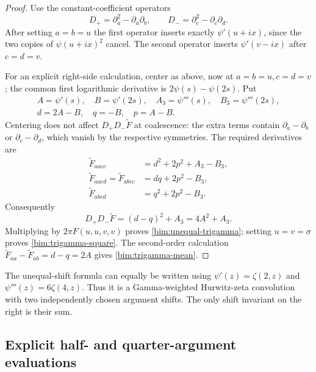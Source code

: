 \documentclass[11pt,a4paper]{article}
\numberwithin{equation}{section}
\theoremstyle{definition}
\theoremstyle{remark}
\begin{document}
\begin{proof}
Use the constant-coefficient operators
\[
 D_+=\partial_a^2-\partial_a\partial_b,
 \qquad D_-=\partial_c^2-\partial_c\partial_d.
\]
After setting $a=b=u$ the first operator inserts exactly
$\psi'(u+ix)$, since the two copies of $\psi(u+ix)^2$ cancel.  The
second operator inserts $\psi'(v-ix)$ after $c=d=v$.

For an explicit right-side calculation, center as above, now at
$a=b=u,c=d=v$; the common first logarithmic derivative is
$2\psi(s)-\psi(2s)$.  Put
\[
 \begin{gathered}
 A=\psi'(s),\quad B=\psi'(2s),\quad
 A_3=\psi'''(s),\quad B_3=\psi'''(2s),\\
 d=2A-B,\quad q=-B,\quad p=A-B.
 \end{gathered}
\]
Centering does not affect $D_+D_-\widetilde F$ at coalescence: the extra
terms contain $\partial_a-\partial_b$ or
$\partial_c-\partial_d$, which vanish by the respective symmetries.
The required derivatives are
\begin{align*}
 \widetilde F_{aacc}&=d^2+2p^2+A_3-B_3,\\
 \widetilde F_{aacd}=\widetilde F_{abcc}&=dq+2p^2-B_3,\\
 \widetilde F_{abcd}&=q^2+2p^2-B_3.
\end{align*}
Consequently
\[
 D_+D_-\widetilde F=(d-q)^2+A_3=4A^2+A_3.
\]
Multiplying by $2\pi F(u,u,v,v)$ proves
\eqref{bim:unequal-trigamma}; setting $u=v=\sigma$ proves
\eqref{bim:trigamma-square}.  The second-order calculation
$\widetilde F_{aa}-\widetilde F_{ab}=d-q=2A$ gives
\eqref{bim:trigamma-mean}.
\end{proof}

The unequal-shift formula can equally be written using
$\psi'(z)=\zeta(2,z)$ and $\psi'''(z)=6\zeta(4,z)$.  Thus it is a
Gamma-weighted Hurwitz-zeta convolution with two independently chosen
argument shifts.  The only shift invariant on the right is their sum.

\subsection{Explicit half- and quarter-argument evaluations}
\end{document}
